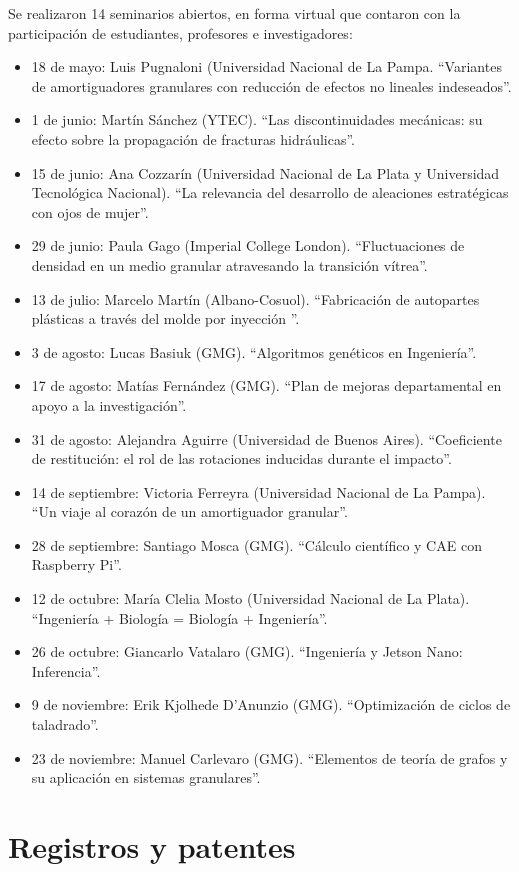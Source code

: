 \documentclass[a4paper,11pt,twoside,final,titlepage,onecolumn,openright]{report}
\begin{document}
Se realizaron 14 seminarios abiertos, en forma virtual que contaron con la participación de estudiantes, profesores e investigadores:
\begin{itemize}
 \item 18 de mayo: Luis Pugnaloni (Universidad Nacional de La Pampa. ``Variantes de amortiguadores granulares con reducción de efectos no lineales indeseados''.
 \item 1 de junio: Martín Sánchez (YTEC). ``Las discontinuidades mecánicas: su efecto sobre la propagación de fracturas hidráulicas''.
 \item 15 de junio: Ana Cozzarín (Universidad Nacional de La Plata y Universidad Tecnológica Nacional). ``La relevancia del desarrollo de aleaciones estratégicas con ojos de mujer''.
 \item 29 de junio: Paula Gago (Imperial College London). ``Fluctuaciones de densidad en un medio granular atravesando la transición vítrea''.
 \item 13 de julio: Marcelo Martín (Albano-Cosuol). ``Fabricación de autopartes plásticas a través del molde por inyección ''.
 \item 3 de agosto: Lucas Basiuk (GMG). ``Algoritmos genéticos en Ingeniería''.
 \item 17 de agosto: Matías Fernández (GMG). ``Plan de mejoras departamental en apoyo a la investigación''.
 \item 31 de agosto: Alejandra Aguirre (Universidad de Buenos Aires). ``Coeficiente de restitución: el rol de las rotaciones inducidas durante el impacto''.
 \item 14 de septiembre: Victoria Ferreyra (Universidad Nacional de La Pampa). ``Un viaje al corazón de un amortiguador granular''.
 \item 28 de septiembre: Santiago Mosca (GMG). ``Cálculo científico y CAE con Raspberry Pi''.
\item 12 de octubre: María Clelia Mosto (Universidad Nacional de La Plata). ``Ingeniería + Biología = Biología + Ingeniería''.
\item 26 de octubre: Giancarlo Vatalaro (GMG). ``Ingeniería y Jetson Nano: Inferencia''.
\item 9 de noviembre: Erik Kjolhede D'Anunzio (GMG). ``Optimización de ciclos de taladrado''.
\item 23 de noviembre: Manuel Carlevaro (GMG). ``Elementos de teoría de grafos y su aplicación en sistemas granulares''.
\end{itemize}

\section{Registros y patentes}
\end{document}
